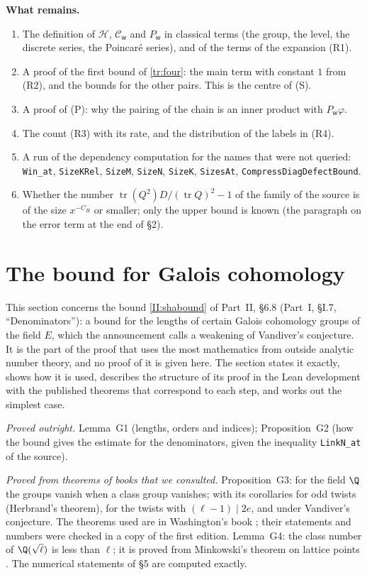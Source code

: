 \documentclass[11pt,letterpaper]{article}
\begin{document}
\textbf{What remains.}
\begin{enumerate}[label=\textup{(\roman*)},leftmargin=2.4em]
\item The definition of $\mathcal H$, $\mathcal C_{\mathsf w}$ and $P_{\mathsf w}$ in classical terms (the group, the
level, the discrete series, the Poincar\'e series), and of the terms of the expansion (R1).
\item A proof of the first bound of \eqref{tr:four}: the main term with constant $1$ from (R2), and the bounds
for the other pairs. This is the centre of (S).
\item A proof of (P): why the pairing of the chain is an inner product with $P_{\mathsf w}\varphi$.
\item The count (R3) with its rate, and the distribution of the labels in (R4).
\item A run of the dependency computation for the names that were not queried: \texttt{Win\_at},
\texttt{SizeKRel}, \texttt{SizeM}, \texttt{SizeN}, \texttt{SizeK}, \texttt{SizesAt},
\texttt{CompressDiagDefectBound}.
\item Whether the number $\operatorname{tr}(Q^2)D/(\operatorname{tr}Q)^2-1$ of the family of the source is of the
size $x^{-C_H}$ or smaller; only the upper bound is known (the paragraph on the error term at the end of \S2).
\end{enumerate}
\endgroup


\section{The bound for Galois cohomology}\label{gc:sec}

This section concerns the bound \eqref{II:shabound} of Part~II, \S6.8 (Part~I, \S I.7, ``Denominators''): a bound
for the lengths of certain Galois cohomology groups of the field $E$, which the announcement \cite{Alp26}
calls a weakening of Vandiver's conjecture. It is the part of the proof that uses the most mathematics from
outside analytic number theory, and no proof of it is given here. The section states it exactly, shows how it
is used, describes the structure of its proof in the Lean development with the published theorems that
correspond to each step, and works out the simplest case.

\emph{Proved outright.} Lemma~G1 (lengths, orders and indices); Proposition~G2 (how the bound gives the
estimate for the denominators, given the inequality \texttt{LinkN\_at} of the source).

\emph{Proved from theorems of books that we consulted.} Proposition~G3: for the field $\Q$ the groups
vanish when a class group vanishes; with its corollaries for odd twists (Herbrand's theorem), for the twists
with $(\ell-1)\mid 2e$, and under Vandiver's conjecture. The theorems used are in Washington's book
\cite{Was82}; their statements and numbers were checked in a copy of the first edition. Lemma~G4: the class
number of $\Q(\sqrt\ell)$ is less than $\ell$; it is proved from Minkowski's theorem on lattice points
\cite[Ch.~I, (4.4)]{Neu99}. The numerical statements of \S5 are computed exactly.
\end{document}
